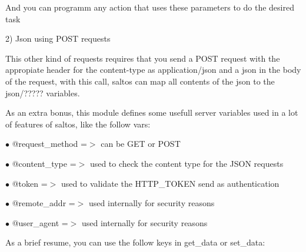 \documentclass[a4paper]{book}
\begin{document}
And you can programm any action that uses these parameters to do the desired task

2) Json using POST requests

This other kind of requests requires that you send a POST request with the appropiate header
for the content-type as application/json and a json in the body of the request, with this
call, saltos can map all contents of the json to the json/????? variables.

As an extra bonus, this module defines some usefull server variables used in a lot of
features of saltos, like the follow vars:

\begin{compactitem}
\item[\color{myblue}$\bullet$] @request\_method =$>$ can be GET or POST
\item[\color{myblue}$\bullet$] @content\_type   =$>$ used to check the content type for the JSON requests
\item[\color{myblue}$\bullet$] @token          =$>$ used to validate the HTTP\_TOKEN send as authentication
\item[\color{myblue}$\bullet$] @remote\_addr    =$>$ used internally for security reasons
\item[\color{myblue}$\bullet$] @user\_agent     =$>$ used internally for security reasons
\end{compactitem}

As a brief resume, you can use the follow keys in get\_data or set\_data:
\end{document}
